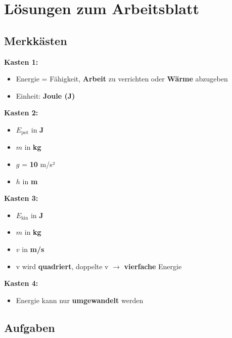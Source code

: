 \documentclass[11pt, a4paper]{article}
\newcommand{\lsg}[1]{\textcolor{loesung}{\textbf{#1}}}
\begin{document}

\newpage
\section*{Lösungen zum Arbeitsblatt}

\subsection*{Merkkästen}

\textbf{Kasten 1:}
\begin{itemize}[leftmargin=2em]
    \item Energie = Fähigkeit, \lsg{Arbeit} zu verrichten oder \lsg{Wärme} abzugeben
    \item Einheit: \lsg{Joule (J)}
\end{itemize}

\textbf{Kasten 2:}
\begin{itemize}[leftmargin=2em]
    \item $E_\text{pot}$ in \lsg{J}
    \item $m$ in \lsg{kg}
    \item $g$ = \lsg{10} m/s²
    \item $h$ in \lsg{m}
\end{itemize}

\textbf{Kasten 3:}
\begin{itemize}[leftmargin=2em]
    \item $E_\text{kin}$ in \lsg{J}
    \item $m$ in \lsg{kg}
    \item $v$ in \lsg{m/s}
    \item v wird \lsg{quadriert}, doppelte v $\rightarrow$ \lsg{vierfache} Energie
\end{itemize}

\textbf{Kasten 4:}
\begin{itemize}[leftmargin=2em]
    \item Energie kann nur \lsg{umgewandelt} werden
\end{itemize}

\subsection*{Aufgaben}
\end{document}
